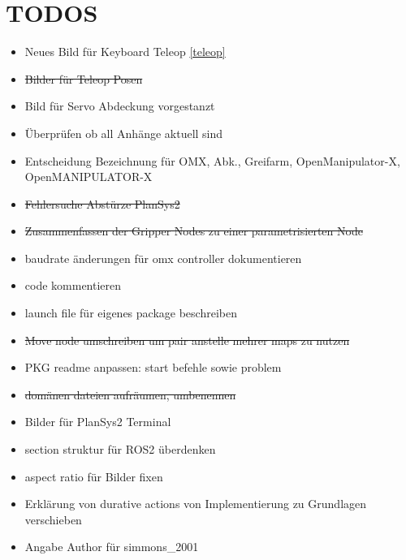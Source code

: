 \section{TODOS}
\begin{itemize}
\item Neues Bild für Keyboard Teleop \ref{teleop}
\item \sout{Bilder für Teleop Posen}
\item Bild für Servo Abdeckung vorgestanzt
\item Überprüfen ob all Anhänge aktuell sind
\item Entscheidung Bezeichnung für OMX, Abk., Greifarm, OpenManipulator-X, OpenMANIPULATOR-X
\item \sout{Fehlersuche Abstürze PlanSys2}
\item \sout{Zusammenfassen der Gripper Nodes zu einer parametrisierten Node}
\item baudrate änderungen für omx controller dokumentieren
\item code kommentieren
\item launch file für eigenes package beschreiben
\item \sout{Move node umschreiben um pair anstelle mehrer maps zu nutzen}
\item PKG readme anpassen: start befehle sowie problem
\item \sout{domänen dateien aufräumen, umbenennen}
\item Bilder für PlanSys2 Terminal
\item section struktur für ROS2 überdenken
\item aspect ratio für Bilder fixen
    \item Erklärung von durative actions von Implementierung zu Grundlagen verschieben
    \item Angabe Author für simmons\_2001
\end{itemize}